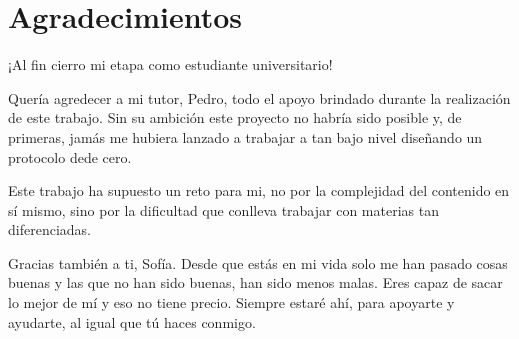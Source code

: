 \chapter*{Agradecimientos}

¡Al fin cierro mi etapa como estudiante universitario!

Quería agredecer a mi tutor, Pedro, todo el apoyo brindado durante la realización de este trabajo. Sin su ambición este proyecto no habría sido posible y, de primeras, jamás me hubiera lanzado a trabajar a tan bajo nivel diseñando un protocolo dede cero.

Este trabajo ha supuesto un reto para mi, no por la complejidad del contenido en sí mismo, sino por la dificultad que conlleva trabajar con materias tan diferenciadas. 

Gracias también a ti, Sofía. Desde que estás en mi vida solo me han pasado cosas buenas y las que no han sido buenas, han sido menos malas. Eres capaz de sacar lo mejor de mí y eso no tiene precio. Siempre estaré ahí, para apoyarte y ayudarte, al igual que tú haces conmigo.   